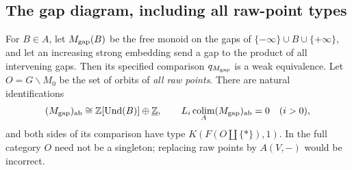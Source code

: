 \subsection{The gap diagram, including all raw-point types}

\begin{theorem}
\label{G:gap}
For $B\in A$, let $M_{\rm gap}(B)$ be the free monoid on the gaps
of $\{-\infty\}\cup B\cup\{+\infty\}$, and let an increasing
strong embedding send a gap to the product of all intervening gaps.
Then its specified comparison $q_{M_{\rm gap}}$ is a weak equivalence.
Let $O=G\backslash M_0$ be the set of orbits of \emph{all raw points}.
There are natural identifications
\[
 (M_{\rm gap})_{\mathrm{ab}}\cong\mathbb Z[\operatorname{Und}(B)]\oplus\underline{\mathbb Z},
 \qquad L_i\operatorname*{colim}_A(M_{\rm gap})_{\mathrm{ab}}=0\quad(i>0),
\]
and both sides of its comparison have type
$K(F(O\amalg\{*\}),1)$.
In the full category $O$ need not be a singleton; replacing raw
points by $A(V,-)$ would be incorrect.
\end{theorem}
